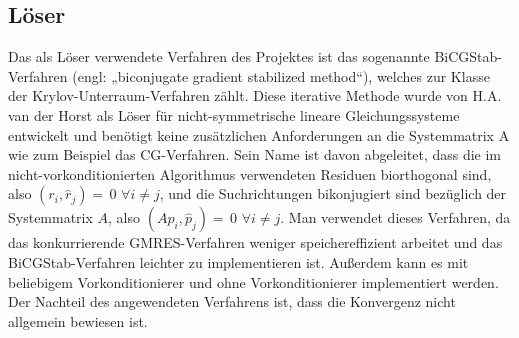 \subsection{Löser}
Das als Löser verwendete Verfahren des Projektes ist das sogenannte BiCGStab-\newline Verfahren (engl: „biconjugate gradient stabilized method“), welches zur Klasse der Krylov-Unterraum-Verfahren zählt. Diese iterative Methode wurde von H.A. van der Horst als Löser für nicht-symmetrische lineare Gleichungssysteme entwickelt und benötigt keine zusätzlichen Anforderungen an die Systemmatrix A wie zum Beispiel das CG-Verfahren. Sein Name ist davon abgeleitet, dass die im nicht-vorkonditionierten Algorithmus verwendeten Residuen biorthogonal sind, also $(r_i,\hat{r}_j)=\,0$ $\forall i\neq j$, und die Suchrichtungen bikonjugiert sind bezüglich der Systemmatrix $A$, also $(Ap_i,\hat{p}_j)=\,0$ $ \forall i \neq j$.  Man verwendet dieses Verfahren, da das konkurrierende GMRES-Verfahren weniger speichereffizient arbeitet und das BiCGStab-Verfahren leichter zu implementieren ist.  Au\ss{}erdem kann es mit beliebigem Vorkonditionierer und ohne Vorkonditionierer implementiert werden. Der Nachteil des angewendeten Verfahrens ist, dass die Konvergenz nicht allgemein bewiesen ist.  \\



